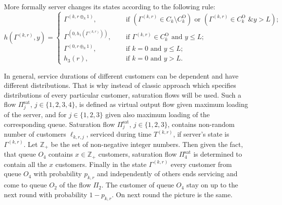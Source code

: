 \documentclass[10pt]{article}
\begin{document}
More formally server changes its states according to the following rule:
\begin{equation}
h(\Gamma^{(k,r)},y) = 
\begin{cases}
\Gamma^{(k,r \oplus_k 1)},& \quad \text{ if } (\Gamma^{(k,r)}\in C_k\setminus C_k^{\mathrm{O}}) \text{ or } (\Gamma^{(k,r)}\in C_k^{\mathrm{O}} \text{ \& } y>L);\\
\Gamma^{(0,h_1(\Gamma^{(k,r)}))},& \quad \text{ if } \Gamma^{(k,r)}\in C_k^{\mathrm{O}} \text{ and } y\leqslant L;\\
\Gamma^{(0,r \oplus_0 1)},& \quad \text{ if } k=0 \text{ and } y\leqslant L;\\
h_3(r),& \quad \text{ if } k=0 \text{ and } y > L.
\end{cases}
\label{hLaw}
\end{equation}

In general, service durations of different customers can be dependent and have different distributions. That is why instead of classic approach  which specifies distributions of every particular customer, saturation flows will be used. Such a flow $\Pi^{\mathrm{\text{sat}}}_j$, $j \in \{1,2,3,4\}$, 
is defined as virtual output flow given maximum loading of the server, and for $j\in \{1, 2, 3\}$ given also maximum loading of the corresponding queue. Saturation flow $\Pi^{\mathrm{\text{sat}}}_j$, $j\in \{1,2,3\}$, 
contains non-random number of customers $\ell_{k,r,j}$, serviced during time $T^{(k,r)}$, if server's state is $\Gamma^{(k,r)}$. Let $\mathbb{Z}_+$ be the set of non-negative integer numbers. Then given the fact, that queue $O_4$ contains $x \in \mathbb{Z}_+$ customers, saturation flow $\Pi^{\mathrm{\text{sat}}}_4$ is determined to contain all the $x$ customers.
Finally in the state $\Gamma^{(k,r)}$ every customer from queue $O_4$ with probability $p_{k,r}$ and independently of others ends servicing and come to queue $O_2$ of the flow $\Pi_2$. The customer of queue $O_4$ stay on up to the next round with probability $1-p_{k,r}$. On next round the picture is the same.
\end{document}
